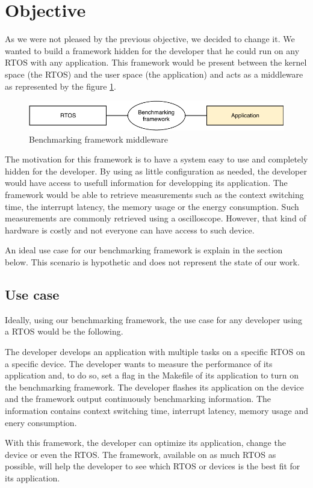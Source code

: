\section{Objective}

As we were not pleased by the previous objective, we decided to change it.
We wanted to build a framework hidden for the developer that he could run on any RTOS with any application. This framework would be present between the kernel space (the RTOS) and the user space (the application) and acts as a middleware as represented by the figure \ref{fig:bench-framework-layers}.

\begin{figure}[!ht]
  \centering
  \includegraphics[scale=1]{assets/bench-framework-layers.pdf}
  \caption{\label{fig:bench-framework-layers}Benchmarking framework middleware}
\end{figure}

The motivation for this framework is to have a system easy to use and completely hidden for the developer.
By using as little configuration as needed, the developer would have access to usefull information for developping its application.
The framework would be able to retrieve measurements such as the context switching time, the interrupt latency, the memory usage or the energy consumption.
Such measurements are commonly retrieved using a oscilloscope.
However, that kind of hardware is costly and not everyone can have access to such device.

An ideal use case for our benchmarking framework is explain in the section below.
This scenario is hypothetic and does not represent the state of our work.

\subsection{Use case}
Ideally, using our benchmarking framework, the use case for any developer using a RTOS would be the following.

The developer develops an application with multiple tasks on a specific RTOS on a specific device.
The developer wants to measure the performance of its application and, to do so, set a flag in the Makefile of its application to turn on the benchmarking framework.
The developer flashes its application on the device and the framework output continuously benchmarking information.
The information contains context switching time, interrupt latency, memory usage and enery consumption.

With this framework, the developer can optimize its application, change the device or even the RTOS.
The framework, available on as much RTOS as possible, will help the developer to see which RTOS or devices is the best fit for its application.